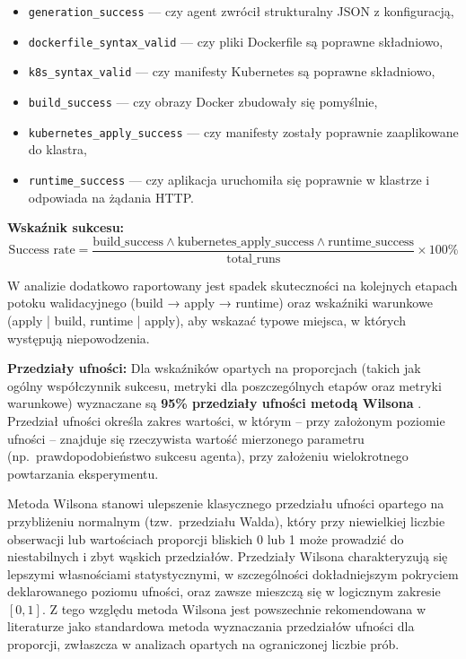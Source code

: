 \begin{itemize}
    \item \texttt{generation\_success} — czy agent zwrócił strukturalny JSON z konfiguracją,
    \item \texttt{dockerfile\_syntax\_valid} — czy pliki Dockerfile są poprawne składniowo,
    \item \texttt{k8s\_syntax\_valid} — czy manifesty Kubernetes są poprawne składniowo,
    \item \texttt{build\_success} — czy obrazy Docker zbudowały się pomyślnie,
    \item \texttt{kubernetes\_apply\_success} — czy manifesty zostały poprawnie zaaplikowane do klastra,
    \item \texttt{runtime\_success} — czy aplikacja uruchomiła się poprawnie w klastrze i odpowiada na żądania HTTP.
\end{itemize}

\textbf{Wskaźnik sukcesu:}
\[
\text{Success rate} = \frac{\text{build\_success} \land \text{kubernetes\_apply\_success} \land \text{runtime\_success}}{\text{total\_runs}} \times 100\%
\]

W analizie dodatkowo raportowany jest spadek skuteczności na kolejnych etapach potoku walidacyjnego (build → apply → runtime) oraz wskaźniki warunkowe (apply | build, runtime | apply), aby wskazać typowe miejsca, w których występują niepowodzenia.

\textbf{Przedziały ufności:}
Dla wskaźników opartych na proporcjach (takich jak ogólny współczynnik sukcesu, metryki dla poszczególnych etapów oraz metryki warunkowe) wyznaczane są \textbf{95\% przedziały ufności metodą Wilsona} \cite{wilson_probable_nodate}.
Przedział ufności określa zakres wartości, w którym -- przy założonym poziomie ufności -- znajduje się rzeczywista wartość mierzonego parametru (np.\ prawdopodobieństwo sukcesu agenta), przy założeniu wielokrotnego powtarzania eksperymentu.

Metoda Wilsona stanowi ulepszenie klasycznego przedziału ufności opartego na przybliżeniu normalnym (tzw.\ przedziału Walda), który przy niewielkiej liczbie obserwacji lub wartościach proporcji bliskich 0 lub 1 może prowadzić do niestabilnych i zbyt wąskich przedziałów.
Przedziały Wilsona charakteryzują się lepszymi własnościami statystycznymi, w szczególności dokładniejszym pokryciem deklarowanego poziomu ufności, oraz zawsze mieszczą się w logicznym zakresie $[0,1]$.
Z tego względu metoda Wilsona jest powszechnie rekomendowana w literaturze jako standardowa metoda wyznaczania przedziałów ufności dla proporcji, zwłaszcza w analizach opartych na ograniczonej liczbie prób.

